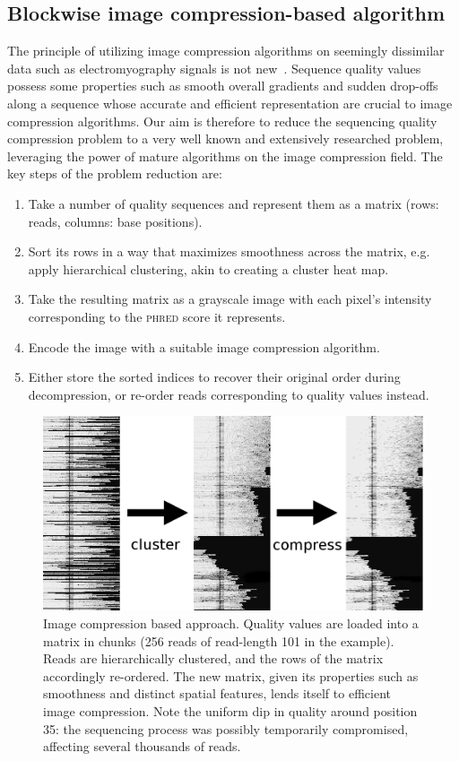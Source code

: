 \documentclass{bioinfo}
\begin{document}
\begin{methods}
\subsection{Blockwise image compression-based algorithm}

The principle of utilizing image compression algorithms on seemingly dissimilar data such as electromyography signals is not new~\cite{costa2008compression}. Sequence quality values possess some properties such as smooth overall gradients and sudden drop-offs along a sequence whose accurate and efficient representation are crucial to image compression algorithms. Our aim is therefore to reduce the sequencing quality compression problem to a very well known and extensively researched problem, leveraging the power of mature algorithms on the image compression field. The key steps of the problem reduction are:

\begin{enumerate}
    \item Take a number of quality sequences and represent them as a matrix (rows: reads, columns: base positions).
    \item Sort its rows in a way that maximizes smoothness across the matrix, e.g. apply hierarchical clustering, akin to creating a cluster heat map.
    \item Take the resulting matrix as a grayscale image with each pixel's intensity corresponding to the \textsc{phred} score it represents.
    \item Encode the image with a suitable image compression algorithm.
    \item Either store the sorted indices to recover their original order during decompression, or re-order reads corresponding to quality values instead.
\end{enumerate}

\begin{figure}[!tpb]%
\centerline{\includegraphics[width=6.9in]{png_pipeline.png}}
\caption{Image compression based approach. Quality values are loaded into a matrix in chunks (256 reads of read-length 101 in the example). Reads are hierarchically clustered, and the rows of the matrix accordingly re-ordered. The new matrix, given its properties such as smoothness and distinct spatial features, lends itself to efficient image compression. Note the uniform dip in quality around position 35: the sequencing process was possibly temporarily compromised, affecting several thousands of reads.}\label{fig:png_method}
\end{figure}


\end{methods}
\end{document}
